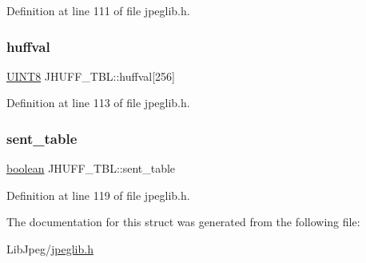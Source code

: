 Definition at line 111 of file jpeglib.\+h.

\mbox{\label{structJHUFF__TBL_a7aad276f6ced97323bb94ba5e6220961}} 
\subsubsection{\texorpdfstring{huffval}{huffval}}
{\footnotesize\ttfamily \mbox{\hyperlink{jmorecfg_8h_adfb9a8ea1dd59f151065f763e1e9acd6}{U\+I\+N\+T8}} J\+H\+U\+F\+F\+\_\+\+T\+B\+L\+::huffval\mbox{[}256\mbox{]}}



Definition at line 113 of file jpeglib.\+h.

\mbox{\label{structJHUFF__TBL_a387c655e83d0d57c50802856d630f37b}} 
\subsubsection{\texorpdfstring{sent\_table}{sent\_table}}
{\footnotesize\ttfamily \mbox{\hyperlink{jmorecfg_8h_a7c6368b321bd9acd0149b030bb8275ed}{boolean}} J\+H\+U\+F\+F\+\_\+\+T\+B\+L\+::sent\+\_\+table}



Definition at line 119 of file jpeglib.\+h.



The documentation for this struct was generated from the following file\+:\begin{DoxyCompactItemize}
\item 
Lib\+Jpeg/\mbox{\hyperlink{jpeglib_8h}{jpeglib.\+h}}\end{DoxyCompactItemize}
